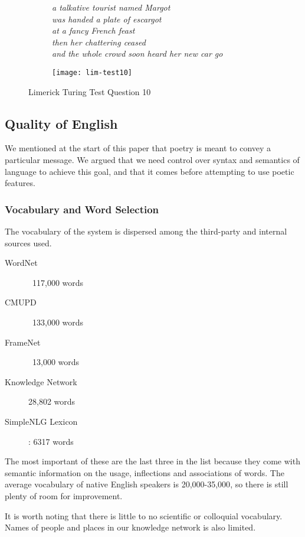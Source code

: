 \begin{figure}[H]
\centering
\begin{subfigure}[t!]{0.45\textwidth}
	\centering
    \textit{a talkative tourist named Margot\\was handed a plate of escargot\\at a fancy French feast\\then her chattering ceased\\and the whole crowd soon heard her new car go}
\end{subfigure}
\begin{subfigure}[t!]{0.45\textwidth}
	\centering
    \texttt{[image: lim-test10]}
\end{subfigure}
\caption{Limerick Turing Test Question 10}
\label{fig:lim-test10}
\end{figure}

\subsection{Quality of English}
We mentioned at the start of this paper that poetry is meant to convey a particular message. We argued that we need control over syntax and semantics of language to achieve this goal, and that it comes before attempting to use poetic features.

\subsubsection{Vocabulary and Word Selection}
The vocabulary of the system is dispersed among the third-party and internal sources used.
\begin{description}
\item[WordNet] ~117,000 words
\item[CMUPD] ~133,000 words
\item[FrameNet] ~13,000 words
\item[Knowledge Network] 28,802 words
\item[SimpleNLG Lexicon]: 6317 words
\end{description}

The most important of these are the last three in the list because they come with semantic information on the usage, inflections and associations of words. The average vocabulary of native English speakers is 20,000-35,000\cite{vocab}, so there is still plenty of room for improvement. 

It is worth noting that there is little to no scientific or colloquial vocabulary. Names of people and places in our knowledge network is also limited.

